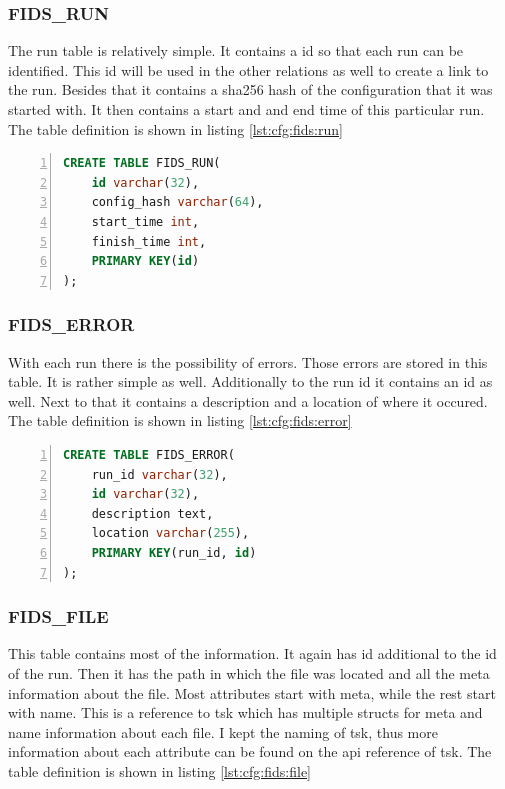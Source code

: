 \subsubsection{FIDS\_RUN}

The run table is relatively simple. It contains a \gls{id} so that each run can be identified. This \gls{id} will be used in the other relations as well to create a link to the run. Besides that it contains a \gls{sha256} hash of the configuration that it was started with. It then contains a start and and end time of this particular run. The table definition is shown in listing \ref{lst:cfg:fids:run}

\begin{lstlisting}[language=sql, numbers=left, caption=Fids Run Table Definition, label=lst:cfg:fids:run]
CREATE TABLE FIDS_RUN(
	id varchar(32), 
	config_hash varchar(64), 
	start_time int, 
	finish_time int, 
	PRIMARY KEY(id)
);
\end{lstlisting}



\subsubsection{FIDS\_ERROR}

With each run there is the possibility of errors. Those errors are stored in this table. It is rather simple as well. Additionally to the run \gls{id} it contains an \gls{id} as well. Next to that it contains a description and a location of where it occured. The table definition is shown in listing \ref{lst:cfg:fids:error}

\begin{lstlisting}[language=sql, numbers=left, caption=Fids Error Table Definition, label=lst:cfg:fids:error]
CREATE TABLE FIDS_ERROR(
	run_id varchar(32), 
	id varchar(32), 
	description text, 
	location varchar(255), 
	PRIMARY KEY(run_id, id)
);
\end{lstlisting}

\subsubsection{FIDS\_FILE}

This table contains most of the information. It again has \gls{id} additional to the \gls{id} of the run. Then it has the path in which the file was located and all the meta information about the file. Most attributes start with meta, while the rest start with name. This is a reference to \gls{tsk} which has multiple structs for meta and name information about each file. I kept the naming of \gls{tsk}, thus more information about each attribute can be found on the \gls{api} reference of \gls{tsk}. \cite{tsk:file:struct} The table definition is shown in listing \ref{lst:cfg:fids:file}

